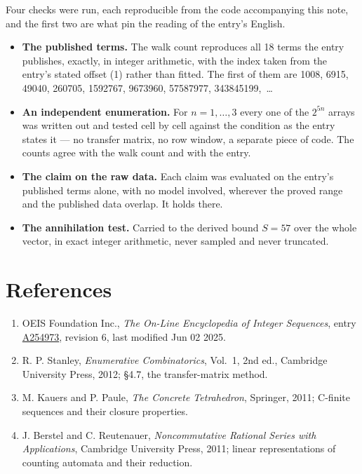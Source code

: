 \documentclass[11pt]{article}
\theoremstyle{definition}
\begin{document}
Four checks were run, each reproducible from the code accompanying this note, and the first two are what pin the reading of the entry's English.

\begin{itemize}

\item {\bfseries The published terms.} The walk count reproduces all 18 terms the entry publishes, exactly, in integer arithmetic, with the index taken from the entry's stated offset (1) rather than fitted. The first of them are 1008, 6915, 49040, 260705, 1592767, 9673960, 57587977, 343845199,~\dots

\item {\bfseries An independent enumeration.} For $n = 1,\dots,3$ every one of the $2^{5n}$ arrays was written out and tested cell by cell against the condition as the entry states it --- no transfer matrix, no row window, a separate piece of code. The counts agree with the walk count and with the entry.

\item {\bfseries The claim on the raw data.} Each claim was evaluated on the entry's published terms alone, with no model involved, wherever the proved range and the published data overlap. It holds there.

\item {\bfseries The annihilation test.} Carried to the derived bound $S = 57$ over the whole vector, in exact integer arithmetic, never sampled and never truncated.

\end{itemize}

\section{References}

\begin{enumerate}

\item OEIS Foundation Inc., \emph{The On-Line Encyclopedia of Integer Sequences}, entry \href{https://oeis.org/A254973}{A254973}, revision 6, last modified Jun 02 2025.

\item R. P. Stanley, \emph{Enumerative Combinatorics}, Vol.~1, 2nd ed., Cambridge University Press, 2012; \S4.7, the transfer-matrix method.

\item M. Kauers and P. Paule, \emph{The Concrete Tetrahedron}, Springer, 2011; C-finite sequences and their closure properties.

\item J. Berstel and C. Reutenauer, \emph{Noncommutative Rational Series with Applications}, Cambridge University Press, 2011; linear representations of counting automata and their reduction.

\end{enumerate}
\end{document}

